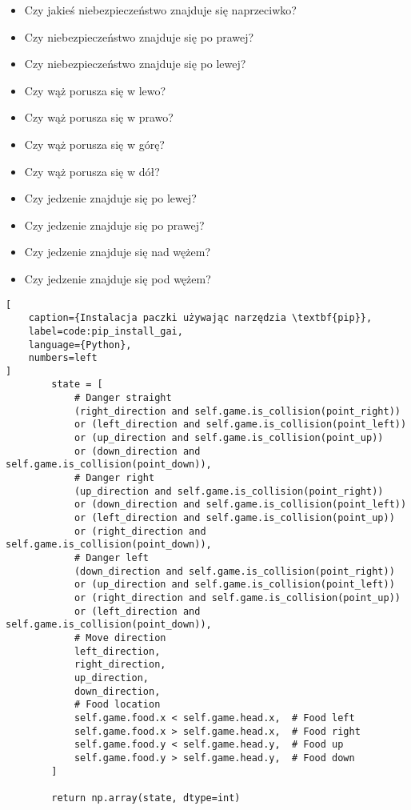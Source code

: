 \begin{itemize}
    \item Czy jakieś niebezpieczeństwo znajduje się naprzeciwko?
    \item Czy niebezpieczeństwo znajduje się po prawej?
    \item Czy niebezpieczeństwo znajduje się po lewej?
    \item Czy wąż porusza się w lewo?
    \item Czy wąż porusza się w prawo?
    \item Czy wąż porusza się w górę?
    \item Czy wąż porusza się w dół?
    \item Czy jedzenie znajduje się po lewej?
    \item Czy jedzenie znajduje się po prawej?
    \item Czy jedzenie znajduje się nad wężem?
    \item Czy jedzenie znajduje się pod wężem?
\end{itemize}


\begin{onepage}
    \begin{lstlisting}[
    caption={Instalacja paczki używając narzędzia \textbf{pip}},
    label=code:pip_install_gai,
    language={Python},
    numbers=left
]
        state = [
            # Danger straight
            (right_direction and self.game.is_collision(point_right))
            or (left_direction and self.game.is_collision(point_left))
            or (up_direction and self.game.is_collision(point_up))
            or (down_direction and self.game.is_collision(point_down)),
            # Danger right
            (up_direction and self.game.is_collision(point_right))
            or (down_direction and self.game.is_collision(point_left))
            or (left_direction and self.game.is_collision(point_up))
            or (right_direction and self.game.is_collision(point_down)),
            # Danger left
            (down_direction and self.game.is_collision(point_right))
            or (up_direction and self.game.is_collision(point_left))
            or (right_direction and self.game.is_collision(point_up))
            or (left_direction and self.game.is_collision(point_down)),
            # Move direction
            left_direction,
            right_direction,
            up_direction,
            down_direction,
            # Food location
            self.game.food.x < self.game.head.x,  # Food left
            self.game.food.x > self.game.head.x,  # Food right
            self.game.food.y < self.game.head.y,  # Food up
            self.game.food.y > self.game.head.y,  # Food down
        ]

        return np.array(state, dtype=int)
    \end{lstlisting}
\end{onepage}


